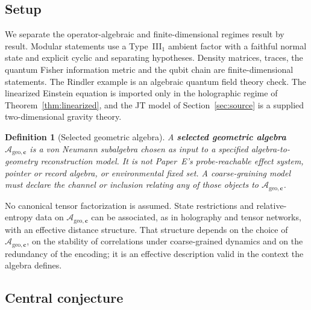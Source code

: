 \documentclass[12pt,a4paper]{article}
\newtheorem{definition}[theorem]{Definition}
\begin{document}
\subsection{Setup}

We separate the operator-algebraic and finite-dimensional regimes result by result. Modular statements use a Type~III$_1$ ambient factor with a faithful normal state and explicit cyclic and separating hypotheses. Density matrices, traces, the quantum Fisher information metric and the qubit chain are finite-dimensional statements. The Rindler example is an algebraic quantum field theory check. The linearized Einstein equation is imported only in the holographic regime of Theorem~\ref{thm:linearized}, and the JT model of Section~\ref{sec:source} is a supplied two-dimensional gravity theory.

\begin{definition}[Selected geometric algebra]
\label{def:accessible}
A \textbf{selected geometric algebra} $\mathcal{A}_{\mathrm{geo},\mathbf{c}}$ is a von Neumann subalgebra chosen as input to a specified algebra-to-geometry reconstruction model. It is not Paper~E's probe-reachable effect system, pointer or record algebra, or environmental fixed set. A coarse-graining model must declare the channel or inclusion relating any of those objects to $\mathcal{A}_{\mathrm{geo},\mathbf{c}}$.
\end{definition}

No canonical tensor factorization is assumed. State restrictions and relative-entropy data on $\mathcal{A}_{\mathrm{geo},\mathbf{c}}$ can be associated, as in holography and tensor networks, with an effective distance structure. That structure depends on the choice of $\mathcal{A}_{\mathrm{geo},\mathbf{c}}$, on the stability of correlations under coarse-grained dynamics and on the redundancy of the encoding; it is an effective description valid in the context the algebra defines.

\subsection{Central conjecture}
\end{document}
